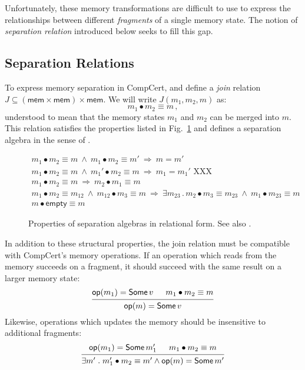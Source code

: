 \documentclass[acmsmall,screen,review,anonymous]{acmart}
\newcommand{\kw}[1]{\ensuremath{ \mathsf{#1} }}
\begin{document}
Unfortunately,
these memory transformations are difficult to use
to express the relationships between
different \emph{fragments} of a single memory state.
The notion of \emph{separation relation} introduced below
seeks to fill this gap.

\subsection{Separation Relations} %

To express memory separation in CompCert,
and define a \emph{join} relation
$J \subseteq (\kw{mem} \times \kw{mem}) \times \kw{mem}$.
We will write $J(m_1, m_2, m)$ as:
\[
  m_1 \bullet m_2 \equiv m
  \,,
\]
understood to mean that
the memory states $m_1$ and $m_2$
can be merged into $m$.
This relation satisfies the properties listed in Fig.~\ref{fig:sepalg}
and defines a separation algebra in the sense of \citet{freshlook}.

\begin{figure}
  \begin{gather*}
    m_1 \bullet m_2 \equiv m \:\wedge\:
      m_1 \bullet m_2 \equiv m' \:\Rightarrow\:
      m = m'
      \\
    m_1 \bullet m_2 \equiv m \:\wedge\:
      m_1' \bullet m_2 \equiv m \:\Rightarrow\:
      m_1 = m_1'
      \text{ XXX}
      \\
    m_1 \bullet m_2 \equiv m \:\Rightarrow\:
      m_2 \bullet m_1 \equiv m
      \\
    m_1 \bullet m_2 \equiv m_{12} \:\wedge\:
      m_{12} \bullet m_3 \equiv m \:\Rightarrow\:
      \exists m_{23} \mathrel.
      m_2 \bullet m_3 \equiv m_{23} \:\wedge\:
      m_1 \bullet m_{23} \equiv m
      \\
    m \bullet \kw{empty} \equiv m
  \end{gather*}
  \caption{Properties of separation algebras
    in relational form. See also \citet{freshlook}.}
  \label{fig:sepalg}
\end{figure}

In addition to these structural properties,
the join relation must be compatible
with CompCert's memory operations.
If an operation which reads from the memory succeeds on a fragment,
it should succeed with the same result on a larger memory state:
\[
  \begin{prooftree}
    \hypo{\kw{op}(m_1) = \kw{Some}\,v}
    \hypo{m_1 \bullet m_2 \equiv m}
    \infer2{\kw{op}(m) = \kw{Some}\,v}
  \end{prooftree}
\]
Likewise,
operations which updates the memory
should be insensitive to additional fragments:
\[
  \begin{prooftree}
    \hypo{\kw{op}(m_1) = \kw{Some}\,m_1'}
    \hypo{m_1 \bullet m_2 \equiv m}
    \infer2{\exists m' \mathrel.
      m_1' \bullet m_2 \equiv m' \wedge
      \kw{op}(m) = \kw{Some}\,m'}
  \end{prooftree}
\]
\end{document}

